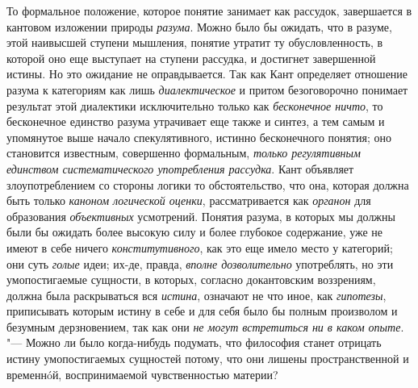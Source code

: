 То формальное положение, которое понятие занимает как
рассудок, завершается в кантовом изложении природы
{\em разума}. Можно было
бы ожидать, что в разуме, этой наивысшей ступени мышления, понятие утратит
ту обусловленность, в которой оно еще выступает на ступени рассудка, и
достигнет завершенной истины. Но это ожидание не оправдывается. Так как
Кант определяет отношение разума к категориям как лишь
{\em диалектическое} и
притом безоговорочно понимает результат этой диалектики исключительно
только как {\em бесконечное ничто},
то бесконечное единство разума утрачивает еще
также и синтез, а тем самым и упомянутое выше начало
спекулятивного, истинно бесконечного понятия; оно становится известным,
совершенно формальным, {\em только
регулятивным единством систематического употребления рассудка}.
Кант объявляет злоупотреблением со стороны логики то
обстоятельство, что она, которая должна быть только
{\em каноном логической оценки},
рассматривается как
{\em органон} для
образования {\em объективных}
усмотрений. Понятия разума, в которых мы должны были бы
ожидать более высокую силу и более глубокое содержание, уже не имеют в себе
ничего {\em конститутивного},
как это еще имело место у категорий; они суть
{\em голые} идеи; их-де,
правда, {\em вполне дозволительно}
употреблять, но эти умопостигаемые сущности, в которых,
согласно докантовским воззрениям, должна была раскрываться вся
{\em истина}, означают не
что иное, как {\em гипотезы},
приписывать которым истину в себе и для себя было бы полным
произволом и безумным дерзновением, так как они
{\em не могут встретиться ни в каком
опыте}. "--- Можно ли было когда-нибудь подумать, что философия
станет отрицать истину умопостигаемых сущностей потому, что они лишены
пространственной и временнóй, воспринимаемой чувственностью материи?

